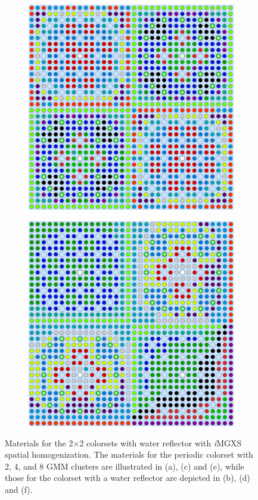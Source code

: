 \documentclass[12pt,twoside]{mitthesis-exec}
\begin{document}
\begin{figure}[h!]
\begin{subfigure}{0.47\textwidth}
  \caption{}
  \label{fig:reflector-4-clusters}
\end{subfigure}
\begin{subfigure}{0.47\textwidth}
  \centering
  \includegraphics[width=0.85\linewidth]{figures/unsupervised/geometries/with-features/8-clusters/combined/2x2}
  \caption{}
  \label{fig:2x2-8-clusters}
\end{subfigure}%
\begin{subfigure}{0.47\textwidth}
  \centering
  \includegraphics[width=0.85\linewidth]{figures/unsupervised/geometries/with-features/8-clusters/combined/reflector}
  \caption{}
  \label{fig:reflector-8-clusters}
\end{subfigure}
\caption[Materials for the 2$\times$2 colorsets with \textit{i}MGXS homogenization]{Materials for the 2$\times$2 colorsets with water reflector with \textit{i}MGXS spatial homogenization. The materials for the periodic colorset with 2, 4, and 8 GMM clusters are illustrated in (a), (c) and (e), while those for the colorset with a water reflector are depicted in (b), (d) and (f).}
\label{fig:colorset-geometries}
\end{figure}
\end{document}
